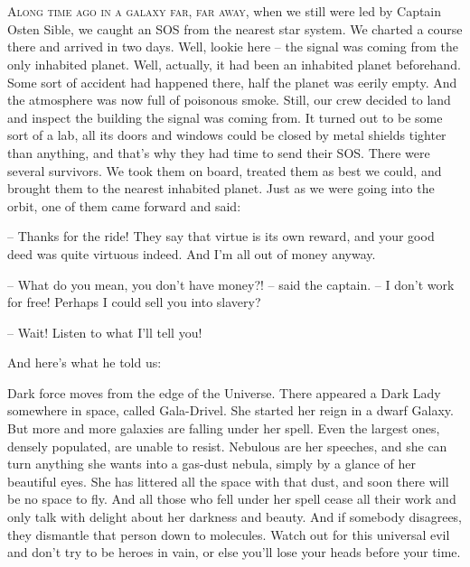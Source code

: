 \documentclass[ebook,oneside,final,openright]{memoir}
\begin{document}
\chapter{}
\par
\lettrine{A}{long time ago in a galaxy far, far away,} when we still were led by Captain Osten Sible, we caught an SOS from the nearest star system. We charted a course there and arrived in two days. Well, lookie here – the signal was coming from the only inhabited planet. Well, actually, it had been an inhabited planet beforehand. Some sort of accident had happened there, half the planet was eerily empty. And the atmosphere was now full of poisonous smoke. Still, our crew decided to land and inspect the building the signal was coming from. It turned out to be some sort of a lab, all its doors and windows could be closed by metal shields tighter than anything, and that’s why they had time to send their SOS. There were several survivors. We took them on board, treated them as best we could, and brought them to the nearest inhabited planet. Just as we were going into the orbit, one of them came forward and said: \par
\par
– Thanks for the ride! They say that virtue is its own reward, and your good deed was quite virtuous indeed. And I’m all out of money anyway.\par
– What do you mean, you don’t have money?! – said the captain. – I don’t work for free! Perhaps I could sell you into slavery? \par
– Wait! Listen to what I’ll tell you! \par
 And here’s what he told us:\par
\par
Dark force moves from the edge of the Universe. There appeared a Dark Lady somewhere in space, called Gala-Drivel. She started her reign in a dwarf Galaxy. But more and more galaxies are falling under her spell. Even the largest ones, densely populated, are unable to resist. Nebulous are her speeches, and she can turn anything she wants into a gas-dust nebula, simply by a glance of her beautiful eyes. She has littered all the space with that dust, and soon there will be no space to fly. And all those who fell under her spell cease all their work and only talk with delight about her darkness and beauty. And if somebody disagrees, they dismantle that person down to molecules. Watch out for this universal evil and don’t try to be heroes in vain, or else you’ll lose your heads before your time.\par
\end{document}
